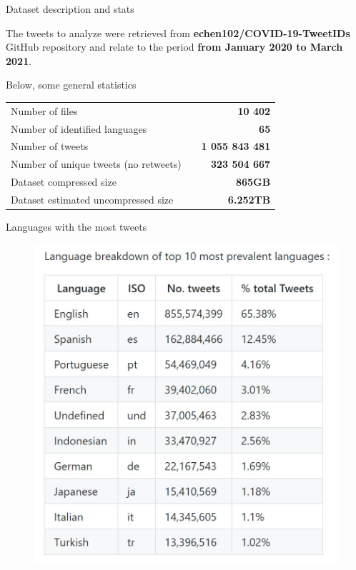 \documentclass[8pt]{beamer}  %
\begin{document}
\begin{frame}{Dataset description and stats}

	The tweets to analyze were retrieved from \textbf{echen102/COVID-19-TweetIDs} GitHub repository\autocite{chen2020tracking} and relate to the period \textbf{from January 2020 to March 2021}. 
	
	Below, some general statistics
	
	\begin{table}[h]
        \centering
        \begin{tabularx}{\textwidth}{lXr}
            Number of files & & \textbf{10 402}
            \\ \lightrule
            Number of identified languages & & \textbf{65}
            \\ \lightrule
            Number of tweets & & \textbf{1 055 843 481}
            \\ \lightrule
            Number of unique tweets (no retweets) & & \textbf{323 504 667}
            \\ \lightrule
            Dataset compressed size & & \textbf{865GB}
            \\ \lightrule
            Dataset estimated uncompressed size & & \textbf{6.252TB}
        \end{tabularx}
    \end{table}

\end{frame}

\begin{frame}{Languages with the most tweets}
    
	\begin{figure}
	    \centering
	    \includegraphics[scale=.5]{assets/img/dataset_most_prevalent_languages.jpg}
	\end{figure}

\end{frame}
\end{document}
